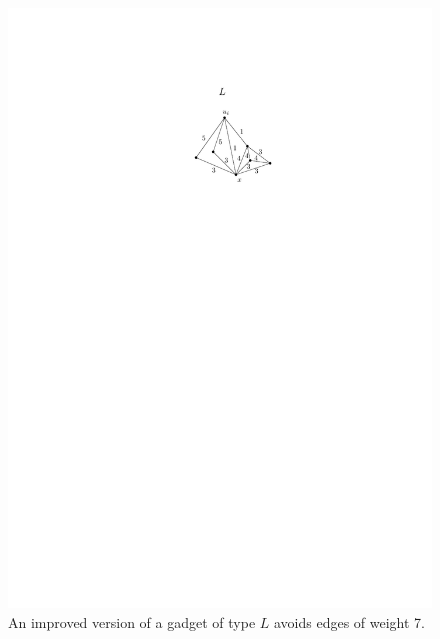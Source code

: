 \documentclass[runningheads]{llncs}
\begin{document}
\appendix
\begin{figure}[htpb]
\centering
\includegraphics[scale=1]{img/act-hamilton-cycle-b}
\caption{An improved version of a gadget of type $L$ avoids edges of weight 7.}
\label{fig_hamilton_cycle_improved}
\end{figure}
\end{document}
